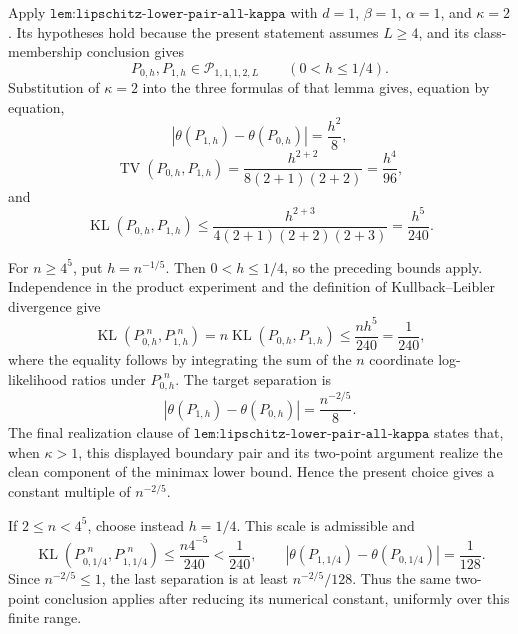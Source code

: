 Apply \(\texttt{lem:lipschitz-lower-pair-all-kappa}\) with \(d=1\), \(\beta=1\), \(\alpha=1\), and \(\kappa=2\).  Its hypotheses hold because the present statement assumes \(L\geq4\), and its class-membership conclusion gives
\[
 P_{0,h},P_{1,h}\in\mathcal P_{1,1,1,2,L}
 \qquad(0<h\leq1/4).
\]
Substitution of \(\kappa=2\) into the three formulas of that lemma gives, equation by equation,
\[
 \left|\theta(P_{1,h})-\theta(P_{0,h})\right|=\frac{h^2}{8},
\]
\[
 \operatorname{TV}(P_{0,h},P_{1,h})
 =\frac{h^{2+2}}{8(2+1)(2+2)}
 =\frac{h^4}{96},
\]
and
\[
 \operatorname{KL}(P_{0,h},P_{1,h})
 \leq \frac{h^{2+3}}{4(2+1)(2+2)(2+3)}
 =\frac{h^5}{240}.
\]

For \(n\geq4^5\), put \(h=n^{-1/5}\).  Then \(0<h\leq1/4\), so the preceding bounds apply.  Independence in the product experiment and the definition of Kullback--Leibler divergence give
\[
 \operatorname{KL}(P_{0,h}^{,n},P_{1,h}^{,n})
 =n\operatorname{KL}(P_{0,h},P_{1,h})
 \leq \frac{nh^5}{240}=\frac1{240},
\]
where the equality follows by integrating the sum of the \(n\) coordinate log-likelihood ratios under \(P_{0,h}^{,n}\).  The target separation is
\[
 \left|\theta(P_{1,h})-\theta(P_{0,h})\right|
 =\frac{n^{-2/5}}8.
\]
The final realization clause of \(\texttt{lem:lipschitz-lower-pair-all-kappa}\) states that, when \(\kappa>1\), this displayed boundary pair and its two-point argument realize the clean component of the minimax lower bound.  Hence the present choice gives a constant multiple of \(n^{-2/5}\).

If \(2\leq n<4^5\), choose instead \(h=1/4\).  This scale is admissible and
\[
 \operatorname{KL}(P_{0,1/4}^{,n},P_{1,1/4}^{,n})
 \leq \frac{n4^{-5}}{240}<\frac1{240},
 \qquad
 \left|\theta(P_{1,1/4})-\theta(P_{0,1/4})\right|=\frac1{128}.
\]
Since \(n^{-2/5}\leq1\), the last separation is at least \(n^{-2/5}/128\).  Thus the same two-point conclusion applies after reducing its numerical constant, uniformly over this finite range.

